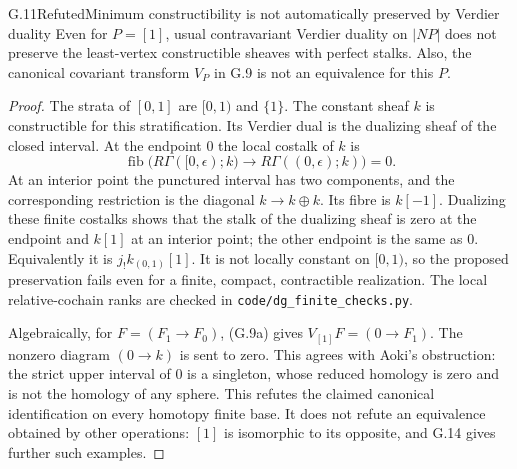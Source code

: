 \begin{claim}{G.11}{Refuted}{Minimum constructibility is not automatically preserved by Verdier duality}
Even for $P=[1]$, usual contravariant Verdier duality on $|NP|$
does not preserve the least-vertex constructible sheaves with
perfect stalks. Also, the canonical covariant transform $V_P$ in
G.9 is not an equivalence for this $P$.
\end{claim}
\begin{proof}
The strata of $[0,1]$ are $[0,1)$ and $\{1\}$. The constant
sheaf $k$ is constructible for this stratification. Its Verdier
dual is the dualizing sheaf of the closed interval. At the endpoint
$0$ the local costalk of $k$ is
\[
 \operatorname{fib}\bigl(R\Gamma([0,\epsilon);k)
             \to R\Gamma((0,\epsilon);k)\bigr)=0.
\]
At an interior point the punctured interval has two components,
and the corresponding restriction is the diagonal $k\to k\oplus k$.
Its fibre is $k[-1]$. Dualizing these finite costalks shows that
the stalk of the dualizing sheaf is zero at the endpoint and
$k[1]$ at an interior point; the other endpoint is the same as
$0$. Equivalently it is $j_!k_{(0,1)}[1]$.
It is not locally constant on $[0,1)$, so the proposed preservation
fails even for a finite, compact, contractible realization.
The local relative-cochain ranks are checked in
\texttt{code/dg\_finite\_checks.py}.

Algebraically, for $F=(F_1\to F_0)$, (G.9a) gives
$V_{[1]}F=(0\to F_1)$. The nonzero diagram $(0\to k)$ is sent
to zero. This agrees with Aoki's obstruction: the strict upper
interval of $0$ is a singleton, whose reduced homology is zero
and is not the homology of any sphere. This refutes the claimed
canonical identification on every homotopy finite base. It does
not refute an equivalence obtained by other operations: $[1]$ is
isomorphic to its opposite, and G.14 gives further such examples.
\end{proof}

